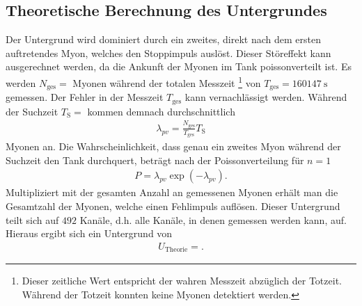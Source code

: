 \subsection{Theoretische Berechnung des Untergrundes}

Der Untergrund wird dominiert durch ein zweites, direkt nach dem ersten auftretendes Myon, welches den Stoppimpuls auslöst.
Dieser Störeffekt kann ausgerechnet werden, da die Ankunft der Myonen im Tank poissonverteilt ist.
Es werden $N_\text{ges} = $ Myonen während der totalen Messzeit \footnote{Dieser zeitliche Wert entspricht der wahren Messzeit abzüglich der Totzeit. Während der Totzeit konnten keine Myonen detektiert werden.} von $T_\text{ges} = \SI{160147}{\second}$ gemessen.
Der Fehler in der Messzeit $T_\text{ges}$ kann vernachlässigt werden.
Während der Suchzeit $T_\text{S} = $ kommen demnach durchschnittlich
\begin{align*}
  \lambda_{pv} = \frac{N_\text{ges}}{T_\text{ges}} T_\text{S}
\end{align*}
Myonen an.
Die Wahrscheinlichkeit, dass genau ein zweites Myon während der Suchzeit den Tank durchquert, beträgt nach der Poissonverteilung für $n=1$
\begin{align*}
  P = \lambda_{pv} \exp{\left(-\lambda_{pv}\right)}.
\end{align*}
Multipliziert mit der gesamten Anzahl an gemessenen Myonen erhält man die Gesamtzahl der Myonen, welche einen Fehlimpuls auflösen.
Dieser Untergrund teilt sich auf $\num{492}$ Kanäle, d.h. alle Kanäle, in denen gemessen werden kann, auf.
Hieraus ergibt sich ein Untergrund von
\begin{align*}
  U_{\text{Theorie}} = .
\end{align*}
